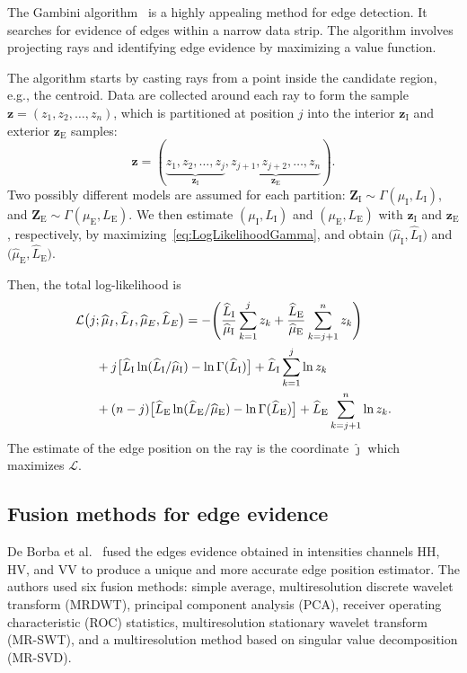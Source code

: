 \documentclass{article}
\begin{document}
The Gambini algorithm~\cite{Gambini2007} is a highly appealing method for edge detection. 
It searches for evidence of edges within a narrow data strip. 
The algorithm involves projecting rays and identifying edge evidence by maximizing a value function.

The algorithm starts by casting rays from a point inside the candidate region, e.g., the centroid.
Data are collected around each ray to form the sample $\bm z = (z_1,z_2,\dots,z_n)$, which is partitioned at position $j$ into the interior $\bm z_\text{I}$ and exterior $\bm z_\text{E}$ samples:
$$
\bm z = (\underbrace{z_1,z_2,\dots,z_j}_{\bm z_\text{I}}, 
\underbrace{z_{j+1}, z_{j+2},\dots,z_n}_{\bm z_\text{E}}).
$$
Two possibly different models are assumed for each partition:
$\bm Z_\text{I} \sim \Gamma(\mu_\text{I},L_\text{I})$, and 
$\bm Z_\text{E} \sim \Gamma(\mu_\text{E},L_\text{E})$.
We then estimate $(\mu_\text{I},L_\text{I})$ and $(\mu_\text{E},L_\text{E})$ with $\bm z_\text{I}$ and $\bm z_\text{E}$, respectively, by maximizing~\eqref{eq:LogLikelihoodGamma}, and obtain $\big(\widehat{\mu}_\text{I}, \widehat{L}_\text{I}\big)$ and $\big(\widehat{\mu}_\text{E}, \widehat{L}_\text{E}\big)$.

Then, the total log-likelihood is
\begin{equation}\label{eq:TotalLogLikelihood}
\begin{aligned}
\mathcal L\big(j&;\widehat{\mu}_I, \widehat{L}_I,\widehat{\mu}_E, \widehat{L}_E\big)= -\Bigg(
	\frac{\widehat{L}_\text{I}}{\widehat{\mu}_\text{I}}\sum_{k=1}^{j} z_k +
	\frac{\widehat{L}_\text{E}}{\widehat{\mu}_\text{E}}\sum_{k=j+1}^{n} z_k  
	\Bigg)\mbox{}\\
&+j \big[\widehat{L}_\text{I}\ln (\widehat{L}_\text{I} / \widehat{\mu}_\text{I}) - \ln \Gamma(\widehat{L}_\text{I})\big]
+\widehat{L}_\text{I} \sum_{k=1}^{j}\ln z_k  \mbox{}\\
&+(n-j) \big[\widehat{L}_\text{E}\ln (\widehat{L}_\text{E} / \widehat{\mu}_\text{E}) - \ln \Gamma(\widehat{L}_\text{E})\big]
+\widehat{L}_\text{E} \sum_{k=j+1}^{n}\ln z_k .%
\raisetag{2.2em}
\end{aligned}
\end{equation}
The estimate of the edge position on the ray is the coordinate  $\widehat\jmath$ which maximizes $\mathcal L$.
\vspace{-0.2cm}
\subsection{Fusion methods for edge evidence}
De Borba et al.~\cite{DeBorba2020} fused the edges evidence obtained in intensities channels HH, HV, and VV to produce a unique and more accurate edge position estimator. 
The authors used six fusion methods: simple average, multiresolution discrete wavelet transform (MRDWT), principal component analysis (PCA), receiver operating characteristic (ROC) statistics, multiresolution stationary wavelet transform (MR-SWT), and a multiresolution method based on singular value decomposition (MR-SVD).
\end{document}
